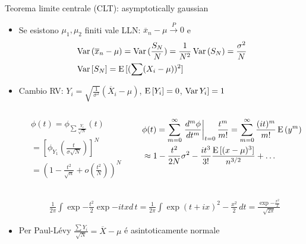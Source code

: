 \documentclass[asd-beamer.tex]{subfiles}
\begin{document}
\begin{frame}{Teorema limite centrale (CLT): asymptotically gaussian}
\begin{itemize}
\item Se esistono $\mu_1, \mu_2$ finiti vale LLN: $\overline{x}_n-\mu\xrightarrow{P}0$ e
\begin{align*}
&\operatorname{Var}{(\overline{x}_n-\mu)}=\operatorname{Var}{(\frac{S_N}{N})}=\frac{1}{N^2}\operatorname{Var}{(S_N)}=\frac{\sigma^2}{N}\\
&\operatorname{Var}{[S_N]}=\operatorname{E}{[(\sum(X_i-\mu))^2]}
\end{align*}
\item Cambio RV: $Y_i=\sqrt{\frac{1}{\sigma^2}}(\overline{X}_i-\mu)$, $\operatorname{E}{[Y_i]}=0$, $\operatorname{Var}{Y_i]}=1$
\begin{columns}[T]
\begin{column}{0.4\textwidth}
\begin{align*}
&\phi(t)=\phi_{\sum\frac{Y_i}{\sqrt{N}}}(t)\\
&=[\phi_{Y_1}(\frac{t}{\sigma\sqrt{N}})]^N\\
&=(1-\frac{t^2}{\sqrt{n}}+o(\frac{t^2}{N}))^N
\end{align*}
	\end{column}
	\begin{column}{0.7\textwidth}
\begin{align*}
&\phi(t)=\sum_{m=0}^{\infty}\left.\frac{d^m\phi}{dt^m}\right|_{t=0}\frac{t^m}{m!}=\sum_{m=0}^{\infty}\frac{(it)^m}{m!}\operatorname{E}{(y^m)}\\
&\approx1-\frac{t^2}{2N}\sigma^2-\frac{it^3}{3!}\frac{\operatorname{E}{[(x-\mu)^3]}}{n^{3/2}}+\ldots
\end{align*}
	\end{column}
\end{columns}
\begin{align*}
&\frac{1}{2\pi}\int\exp{-\frac{t^2}{2}}\exp{-itx}d\,t=\frac{1}{2\pi}\int\exp{(t+ix)^2-\frac{x^2}{2}}\,dt=\frac{\exp{-\frac{x^2}{2}}}{\sqrt{2\pi}}
\end{align*}
\item Per Paul-L\'evy $\frac{\sum Y_i}{\sqrt{N}}=\overline{X}-\mu$ \'e asintoticamente normale
\end{itemize}
\end{frame}
\end{document}
